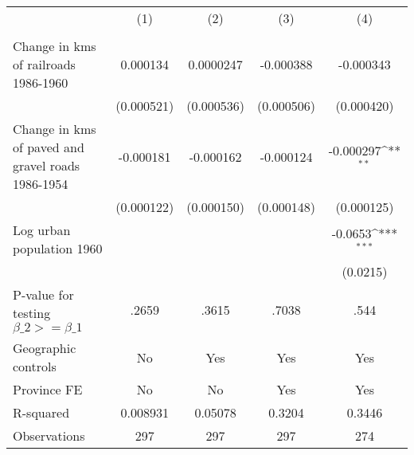 {
\def\sym#1{\ifmmode^{#1}\else\(^{#1}\)\fi}
\begin{tabular}{l*{4}{c}}
\hline\hline
                &\multicolumn{1}{c}{(1)}&\multicolumn{1}{c}{(2)}&\multicolumn{1}{c}{(3)}&\multicolumn{1}{c}{(4)}\\
                &\multicolumn{1}{c}{}&\multicolumn{1}{c}{}&\multicolumn{1}{c}{}&\multicolumn{1}{c}{}\\
\hline
Change in kms of railroads 1986-1960& 0.000134         &0.0000247         &-0.000388         &-0.000343         \\
                &(0.000521)         &(0.000536)         &(0.000506)         &(0.000420)         \\
[1em]
Change in kms of paved and gravel roads 1986-1954&-0.000181         &-0.000162         &-0.000124         &-0.000297\sym{**} \\
                &(0.000122)         &(0.000150)         &(0.000148)         &(0.000125)         \\
[1em]
Log urban population 1960&                  &                  &                  &  -0.0653\sym{***}\\
                &                  &                  &                  & (0.0215)         \\
\hline
P-value for testing $\beta\_{2} >= \beta\_{1}$&    .2659         &    .3615         &    .7038         &     .544         \\
Geographic controls&       No         &      Yes         &      Yes         &      Yes         \\
Province FE     &       No         &       No         &      Yes         &      Yes         \\
R-squared       & 0.008931         &  0.05078         &   0.3204         &   0.3446         \\
Observations    &      297         &      297         &      297         &      274         \\
\hline\hline
\end{tabular}
}
